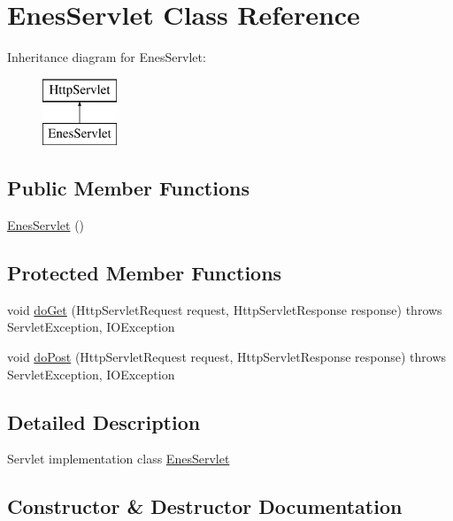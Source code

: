 \hypertarget{class_enes_servlet}{}\section{Enes\+Servlet Class Reference}
\label{class_enes_servlet}
Inheritance diagram for Enes\+Servlet\+:\begin{figure}[H]
\begin{center}
\leavevmode
\includegraphics[height=2.000000cm]{class_enes_servlet}
\end{center}
\end{figure}
\subsection*{Public Member Functions}
\begin{DoxyCompactItemize}
\item 
\hyperlink{class_enes_servlet_ab2c4a798526e86540e90c65ee48fa081}{Enes\+Servlet} ()
\end{DoxyCompactItemize}
\subsection*{Protected Member Functions}
\begin{DoxyCompactItemize}
\item 
void \hyperlink{class_enes_servlet_aa6af381d4229895e07a125b9342e71a1}{do\+Get} (Http\+Servlet\+Request request, Http\+Servlet\+Response response)  throws Servlet\+Exception, I\+O\+Exception 
\item 
void \hyperlink{class_enes_servlet_a438292b768bc1ff3606769e3a0b8b397}{do\+Post} (Http\+Servlet\+Request request, Http\+Servlet\+Response response)  throws Servlet\+Exception, I\+O\+Exception 
\end{DoxyCompactItemize}


\subsection{Detailed Description}
Servlet implementation class \hyperlink{class_enes_servlet}{Enes\+Servlet} 

\subsection{Constructor \& Destructor Documentation}
\hypertarget{class_enes_servlet_ab2c4a798526e86540e90c65ee48fa081}{}
